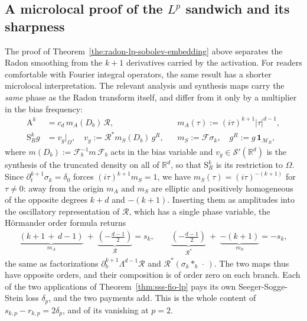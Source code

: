 \documentclass[12pt]{article}
\numberwithin{equation}{section}
\numberwithin{figure}{section}
\numberwithin{equation}{section}
\begin{document}
\subsection{A microlocal proof of the \texorpdfstring{$L^p$}{Lp} sandwich and its sharpness}
\label{subsec:insightful-proof-microlocal}
The proof of Theorem~\ref{the:radon-lp-sobolev-embedding} above separates the
Radon smoothing from the $k+1$ derivatives carried by the activation.  For readers
comfortable with Fourier integral operators, the same result has a shorter
microlocal interpretation.  
The relevant analysis and synthesis maps carry the \emph{same} phase as the Radon
transform itself, and differ from it only by a multiplier in the bias frequency:
\begin{align}
    \mathrm{A}^k&=c_d\,m_A(D_b)\,\mathcal R,
    &&m_A(\tau):=(i\tau)^{k+1}|\tau|^{d-1},
    \label{eq:Rk-as-composition}\\
    \mathrm{S}^k_R g&=v_g\big|_{\Omega},
    \quad v_g:=\mathcal R^{*}m_S(D_b)\,g^{R},
    &&m_S:=\mathcal F\sigma_k,
    \quad g^{R}:=g\,\mathbf 1_{\mathcal{M}_R},
    \label{eq:AR-as-composition}
\end{align}
where $m(D_b):=\mathcal F_b^{-1}m\,\mathcal F_b$ acts in the bias variable and
$v_g\in\mathcal S'(\mathbb{R}^d)$ is the synthesis of the truncated density on all of
$\mathbb{R}^d$, so that $\mathrm{S}^k_R$ is its restriction to $\Omega$.  Since
$\partial_t^{k+1}\sigma_k=\delta_0$ forces $(i\tau)^{k+1}m_S=1$, we have
$m_S(\tau)=(i\tau)^{-(k+1)}$ for $\tau\neq0$: away from the origin $m_A$ and $m_S$ are
elliptic and positively homogeneous of the opposite degrees $k+d$ and $-(k+1)$.
Inserting them as amplitudes into the oscillatory representation of $\mathcal R$, which
has a single phase variable, the H\"ormander order formula returns
\begin{align*}
    \underbrace{(k+1\, + \, d-1)}_{m_A} \ +\  \underbrace{(-\frac{d-1}{2})}_{\mathcal{R}}=s_k,
    \qquad
    \underbrace{(-\frac{d-1}{2})}_{\mathcal{R}^*} \  +\  \underbrace{-(k+1)}_{m_S} =-s_k ,
\end{align*}
the same as  factorizations $\partial_b^{k+1}\Lambda^{d-1}\mathcal R$ and
$\mathcal R^{*}(\sigma_k*_b\,\cdot\,)$.
The two maps thus have opposite orders, and their composition is of order zero on each
branch.  Each of the two applications of Theorem~\ref{thm:sss-fio-lp} pays its 
own Seeger-Sogge-Stein loss $\delta_p$, and the two
payments add.  This is the whole content of $s_{k,p}-r_{k,p}=2\delta_p$, and of its
vanishing at $p=2$.
\end{document}
